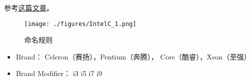 
\begin{issues}
\issueDraft
\end{issues}

参考\href{https://www.itechtics.com/processor-generations/}{这篇文章}。

\begin{figure}[ht]
\centering
\texttt{[image: ./figures/IntelC\_1.png]}
\caption{命名规则} \label{IntelC_fig1}
\end{figure}

\begin{itemize}
\item Brand： Celeron（赛扬），Pentium（奔腾）， Core（酷睿），Xeon（至强）
\item Brand Modifier： i3 i5 i7 i9
\end{itemize}
